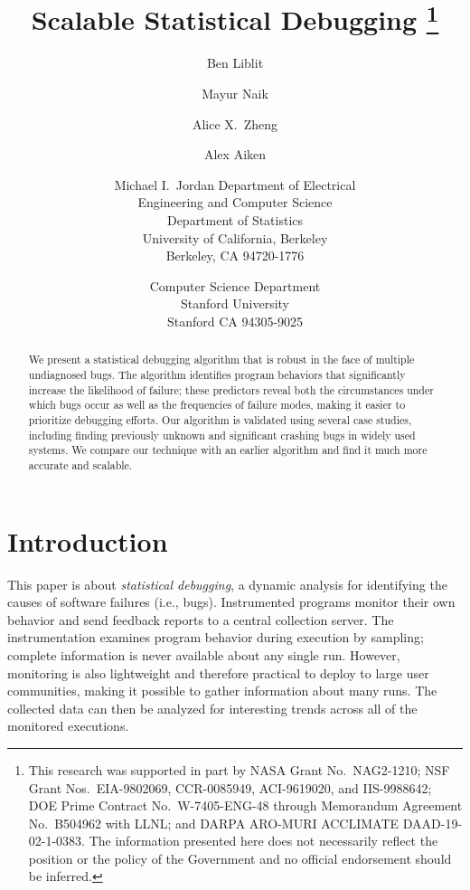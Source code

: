 \documentclass[draft]{sig-alternate}
\title{Scalable Statistical Debugging
  \renewcommand{\footnotemark}[0]{}
  \thanks{This research was supported in part by NASA Grant No.\
    NAG2-1210; NSF Grant Nos.\ EIA-9802069, CCR-0085949, ACI-9619020,
    and IIS-9988642; DOE Prime Contract No.\ W-7405-ENG-48 through
    Memorandum Agreement No.\ B504962 with LLNL; and DARPA ARO-MURI 
    ACCLIMATE DAAD-19-02-1-0383.  The information
    presented here does not necessarily reflect the position or the
    policy of the Government and no official endorsement should be
    inferred.}
}
\author{%
  Ben Liblit \eecs
  \and Mayur Naik \stan
  \and Alice X.\ Zheng \eecs
  \and Alex Aiken \stan
  \and Michael I.\ Jordan \both
  \moreauthors
  \eecs Department of Electrical \\
  Engineering and Computer Science \\
  \stat Department of Statistics \\
  University of California, Berkeley \\
  Berkeley, CA 94720-1776
  \and
  \stan Computer Science Department \\
  Stanford University \\
  Stanford CA 94305-9025
}
\newcommand{\termdef}[1]{\textit{#1}}
\newcommand{\issue}[2][]{}
\begin{document}
\issue[Alice]{Overall comment: font too small?}

\maketitle

\begin{abstract}
  We present a statistical debugging algorithm that is
  robust in the face of multiple undiagnosed bugs.  The algorithm
  identifies program behaviors that significantly increase the
  likelihood of failure; these predictors reveal both the
  circumstances under which bugs occur as well as the frequencies of
  failure modes, making it easier to prioritize debugging efforts.
  Our algorithm is validated using several case studies, including finding
  previously unknown and significant crashing bugs in widely used systems.
  We compare our technique with an earlier algorithm and find it much more accurate 
  and scalable.
\end{abstract}






\section{Introduction}
\label{sec:introduction}

\issue[Alice]{Too much notation in introduction?}

This paper is about \termdef{statistical debugging}, a dynamic
analysis for identifying the causes of software failures (i.e., bugs).
Instrumented programs monitor their own behavior and send feedback
reports to a central collection server.  The instrumentation examines
program behavior during execution by sampling; complete information is
never available about any single run.  However, monitoring is also
lightweight and therefore practical to deploy to large user
communities, making it possible to gather information about many runs.
The collected data can then be analyzed for interesting trends across
all of the monitored executions.
\end{document}
